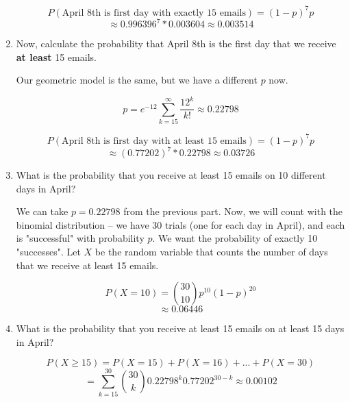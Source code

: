 \begin{enumerate}[label=(\alph*)]
\begin{solution}[2cm]
$$P(\text{April 8th is first day with exactly 15 emails}) = (1-p)^7 p$$
$$\approx 0.996396^7 * 0.003604 \approx 0.003514$$
\end{solution}

\item Now, calculate the probability that April 8th is the first day that we receive \textbf{at least} 15 emails.
\begin{solution}[2cm]
Our geometric model is the same, but we have a different $p$ now.

$$p = e^{-12} \sum_{k = 15}^\infty \frac{12^k}{k!} \approx 0.22798$$

$$P(\text{April 8th is first day with at least 15 emails}) = (1-p)^7 p$$
$$\approx (0.77202)^7 * 0.22798 \approx 0.03726$$
\end{solution}

\item What is the probability that you receive at least 15 emails on 10 different days in April?
\begin{solution}[2cm]
We can take $p = 0.22798$ from the previous part. Now, we will count with the binomial distribution – we have 30 trials (one for each day in April), and each is "successful" with probability $p$. We want the probability of exactly 10 "successes". Let $X$ be the random variable that counts the number of days that we receive at least 15 emails.

$$P(X = 10) = {30 \choose 10} p^{10} (1-p)^{20}$$
$$\approx 0.06446$$
\end{solution}

\item What is the probability that you receive at least 15 emails on at least 15 days in April?
\begin{solution}[2cm]
$$P(X \geq 15) = P(X = 15) + P(X = 16) + ... + P(X = 30)$$
$$= \sum_{k = 15}^{30} {30 \choose k} 0.22798^k 0.77202^{30-k} \approx 0.00102$$
\end{solution}

\end{enumerate}